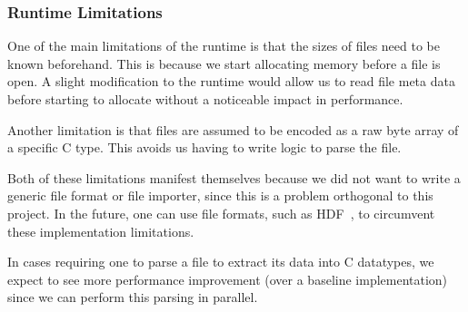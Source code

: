 
\subsubsection{Runtime Limitations}

One of the main limitations of the runtime is that the sizes of files need to
	be known beforehand.
This is because we start allocating memory before a file is open.
A slight modification to the runtime would allow us to read file meta data
	before starting to allocate without a noticeable impact in performance.

Another limitation is that files are assumed to be encoded as a raw byte
	array of a specific C type.
This avoids us having to write logic to parse the file.

Both of these limitations manifest themselves because we did not want to
	write a generic file format or file importer, since this is a problem
	orthogonal to this project.
In the future, one can use file formats,
	such as HDF~\cite{folk2011overview}, to circumvent these implementation
	limitations.

In cases requiring one to parse a file to extract its data into
	C datatypes, we expect to see more performance
	improvement (over a baseline implementation) since we can perform
	this parsing in parallel.
